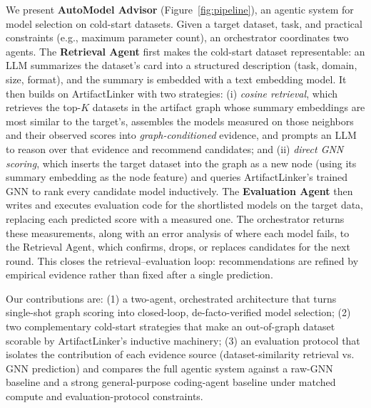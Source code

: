 We present \textbf{AutoModel Advisor} (Figure~\ref{fig:pipeline}), an agentic system for model selection on cold-start datasets. Given a target dataset, task, and practical constraints (e.g., maximum parameter count), an orchestrator coordinates two agents. The \textbf{Retrieval Agent} first makes the cold-start dataset representable: an LLM summarizes the dataset's card into a structured description (task, domain, size, format), and the summary is embedded with a text embedding model. It then builds on ArtifactLinker with two strategies: (i) \emph{cosine retrieval}, which retrieves the top-$K$ datasets in the artifact graph whose summary embeddings are most similar to the target's, assembles the models measured on those neighbors and their observed scores into \emph{graph-conditioned} evidence, and prompts an LLM to reason over that evidence and recommend candidates; and (ii) \emph{direct GNN scoring}, which inserts the target dataset into the graph as a new node (using its summary embedding as the node feature) and queries ArtifactLinker's trained GNN to rank every candidate model inductively. The \textbf{Evaluation Agent} then writes and executes evaluation code for the shortlisted models on the target data, replacing each predicted score with a measured one. The orchestrator returns these measurements, along with an error analysis of where each model fails, to the Retrieval Agent, which confirms, drops, or replaces candidates for the next round. This closes the retrieval--evaluation loop: recommendations are refined by empirical evidence rather than fixed after a single prediction.


Our contributions are: (1) a two-agent, orchestrated architecture that turns single-shot graph scoring into closed-loop, de-facto-verified model selection; (2) two complementary cold-start strategies that make an out-of-graph dataset scorable by ArtifactLinker's inductive machinery; (3) an evaluation protocol that isolates the contribution of each evidence source (dataset-similarity retrieval vs. GNN prediction) and compares the full agentic system against a raw-GNN baseline and a strong general-purpose coding-agent baseline under matched compute and evaluation-protocol constraints.